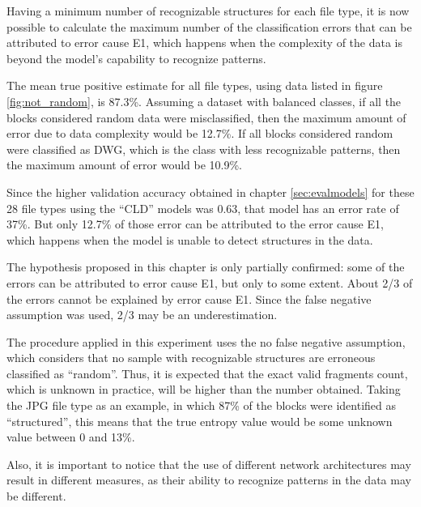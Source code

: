 Having a minimum number of recognizable structures for each file type, it is now possible to calculate the maximum number of the classification errors that can be attributed to error cause E1, which happens when the complexity of the data is beyond the model’s capability to recognize patterns.

The mean true positive estimate for all file types, using data listed in figure \ref{fig:not_random}, is 87.3\%.  Assuming a dataset with balanced classes, if all the blocks considered random data were misclassified, then the maximum amount of error due to data complexity would be 12.7\%. If all blocks considered random were classified as DWG, which is the class with less recognizable patterns, then the maximum amount of error would be 10.9\%.

Since the higher validation accuracy obtained in chapter \ref{sec:evalmodels} for these 28 file types using the ``CLD'' models was 0.63, that model has an error rate of 37\%. But only 12.7\% of those error can be attributed to the error cause E1, which happens when the model is unable to detect structures in the data.

The hypothesis proposed in this chapter is only partially confirmed: some of the errors can be attributed to error cause E1, but only to some extent. About 2/3 of the errors cannot be explained by error cause E1. Since the false negative assumption was used, 2/3 may be an underestimation.


The procedure applied in this experiment uses the no false negative assumption, which considers that no sample with recognizable structures are erroneous classified as ``random''. Thus, it is expected that the exact valid fragments count, which is unknown in practice, will be higher than the number obtained. Taking the JPG file type as an example, in which 87\% of the blocks were identified as ``structured'', this means that the true entropy value would be some unknown value between 0 and 13\%.

Also, it is important to notice that the use of different network architectures may result in different measures, as their ability to recognize patterns in the data may be different.